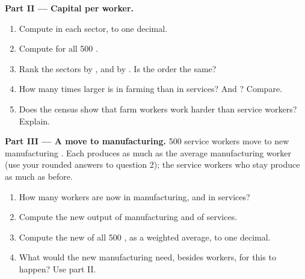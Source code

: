 \begin{problem}
\medskip
\noindent\textbf{Part II --- Capital per worker.}
\begin{enumerate}[resume]
  \item Compute  in each sector, to one decimal.
  \item Compute  for all 500 .
  \item Rank the sectors by , and by . Is the order the same?
  \item How many times larger is  in farming than in services? And ? Compare.
  \item Does the census show that farm workers work harder than service workers? Explain.
\end{enumerate}

\medskip
\noindent\textbf{Part III --- A move to manufacturing.} 500 service workers move to new
manufacturing . Each produces as much as the average manufacturing worker (use your rounded
answers to question 2); the service workers who stay produce as much as before.
\begin{enumerate}[resume]
  \item How many workers are now in manufacturing, and in services?
  \item Compute the new output of manufacturing and of services.
  \item Compute the new  of all 500 , as a weighted average, to one decimal.
  \item What would the new manufacturing  need, besides workers, for this to happen? Use
        part II.
\end{enumerate}
\end{problem}
